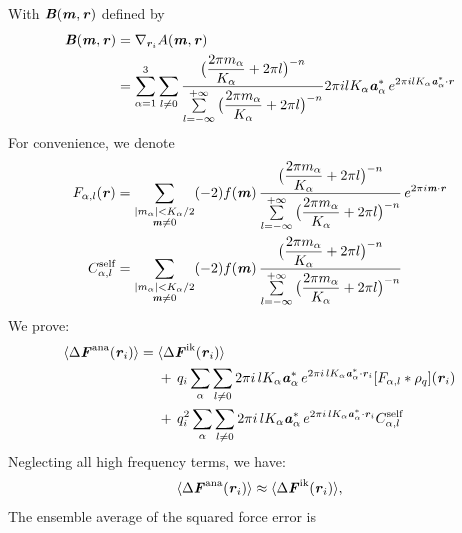 \documentclass[aps,pre,preprint]{revtex4-1}
\renewcommand{\v}[1]{\textbf{\textit{#1}}}
\begin{document}
With $\v B(\v m, \v r)$ defined by
\begin{align}\nonumber
  \v B(\v m, \v r)
  &=
  \nabla_{\v r_i}A(\v m, \v r)\\
  &=
  \sum_{\alpha=1}^3\sum_{l\neq 0}
  \frac
  {\big(\dfrac{2\pi m_\alpha}{K_\alpha} + 2\pi l\big)^{-n}}
  {\sum\limits_{l=-\infty}^{+\infty}
    \big(\dfrac{2\pi m_\alpha}{K_\alpha} + 2\pi l\big)^{-n}}
  2\pi i l K_\alpha\v a_\alpha^\ast\,e^{2\pi i l K_\alpha\v a^\ast_\alpha\cdot \v r} 
\end{align}
For convenience, we denote
\begin{align}
  F_{\alpha,l} (\v r)
  &=
  \sum_{
    \begin{subarray}{c}
      \vert m_{\alpha}\vert < K_\alpha/2\\
      \v m\neq 0
    \end{subarray}}
  (-2)f(\v m)\,
  \frac
  {\big(\dfrac{2\pi m_\alpha}{K_\alpha} + 2\pi l\big)^{-n}}
  {\sum\limits_{l=-\infty}^{+\infty}
    \big(\dfrac{2\pi m_\alpha}{K_\alpha} + 2\pi l\big)^{-n}}\,
  e^{2\pi i\v m\cdot \v r}\\
  C_{\alpha,l}^{\textrm{self}}
  &= 
  \sum_{
    \begin{subarray}{c}
      \vert m_{\alpha}\vert < K_\alpha/2\\
      \v m\neq 0
    \end{subarray}}
  (-2)f(\v m)\,
  \frac
  {\big(\dfrac{2\pi m_\alpha}{K_\alpha} + 2\pi l\big)^{-n}}
  {\sum\limits_{l=-\infty}^{+\infty}
    \big(\dfrac{2\pi m_\alpha}{K_\alpha} + 2\pi l\big)^{-n}}\,
\end{align}
We prove:
\begin{align} \nonumber
  \langle \Delta\v F^{\textrm{ana}}(\v r_i)\rangle
  =\;&
  \langle \Delta\v F^{\textrm{ik}}(\v r_i)\rangle\\\nonumber
  &+\,
  q_i\sum_{\alpha}\sum_{l\neq 0}
  2\pi i\,l K_\alpha\v a_\alpha^\ast\,e^{2\pi i\,l K_\alpha\v a^\ast_\alpha\cdot \v r_i}
  [F_{\alpha,l}\ast\rho_q](\v r_i) \\\label{eqn:tmp30}
  &+\,
  q^2_i\sum_{\alpha}\sum_{l\neq 0}
  2\pi i\,l K_\alpha\v a_\alpha^\ast\,e^{2\pi i\,l K_\alpha\v a^\ast_\alpha\cdot \v r_i}
  C_{\alpha,l}^{\textrm{self}}
\end{align}
Neglecting all high frequency terms, we have:
\begin{align}\label{eqn:tmp31}
  \langle \Delta\v F^{\textrm{ana}}(\v r_i)\rangle
  \approx
  \langle \Delta\v F^{\textrm{ik}}(\v r_i)\rangle,
\end{align}
The ensemble average of the squared force error is
\end{document}
